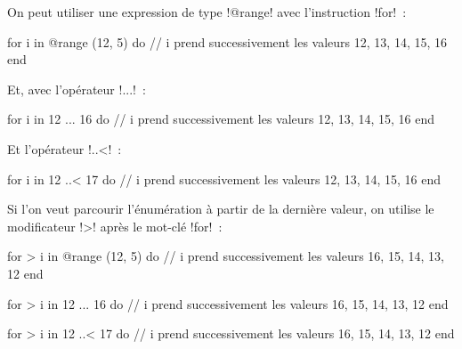 On peut utiliser une expression de type \ggsq!@range! avec l'instruction \ggsq!for!~:

\begin{galgas4}
for i in @range (12, 5) do
  // i prend successivement les valeurs 12, 13, 14, 15, 16
end
\end{galgas4}

Et, avec l'opérateur \ggsq!...!~:
\begin{galgas4}
for i in 12 ... 16 do
  // i prend successivement les valeurs 12, 13, 14, 15, 16
end
\end{galgas4}

Et l'opérateur \ggsq!..<!~:
\begin{galgas4}
for i in 12 ..< 17 do
  // i prend successivement les valeurs 12, 13, 14, 15, 16
end
\end{galgas4}

Si l'on veut parcourir l'énumération à partir de la dernière valeur, on utilise le modificateur \ggsq!>! après le mot-clé \ggsq!for!~:
\begin{galgas4}
for > i in @range (12, 5) do
  // i prend successivement les valeurs 16, 15, 14, 13, 12
end
\end{galgas4}

\begin{galgas4}
for > i in 12 ... 16 do
  // i prend successivement les valeurs 16, 15, 14, 13, 12
end
\end{galgas4}

\begin{galgas4}
for > i in 12 ..< 17 do
  // i prend successivement les valeurs 16, 15, 14, 13, 12
end
\end{galgas4}


